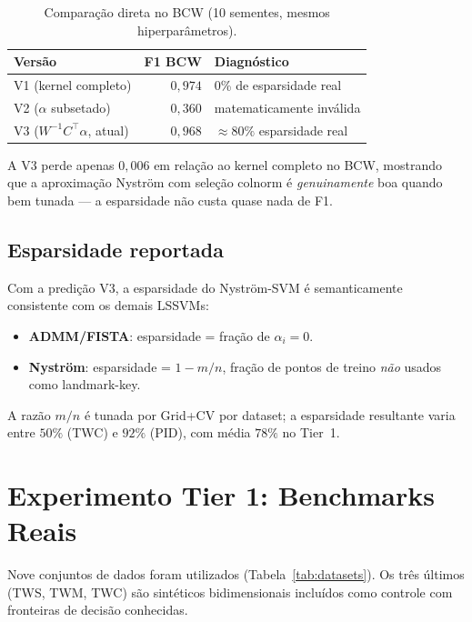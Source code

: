 \documentclass[12pt,a4paper]{article}
\begin{document}
\begin{table}[H]
\centering
\caption{Comparação direta no BCW (10 sementes, mesmos hiperparâmetros).}
\label{tab:nystrom_audit}
\begin{tabular}{lrl}
\toprule
\textbf{Versão} & \textbf{F1 BCW} & \textbf{Diagnóstico} \\
\midrule
V1 (kernel completo)        & $0{,}974$ & 0\% de esparsidade real \\
V2 ($\alpha$ subsetado)      & $0{,}360$ & matematicamente inválida \\
V3 ($W^{-1}C^\top\alpha$, atual) & $0{,}968$ & $\approx 80\%$ esparsidade real \\
\bottomrule
\end{tabular}
\end{table}

A V3 perde apenas $0{,}006$ em relação ao kernel completo no BCW, mostrando
que a aproximação Nyström com seleção colnorm é \emph{genuinamente} boa
quando bem tunada --- a esparsidade não custa quase nada de F1.

\subsection{Esparsidade reportada}

Com a predição V3, a esparsidade do Nyström-SVM é semanticamente consistente
com os demais LSSVMs:
\begin{itemize}
  \item \textbf{ADMM/FISTA}: esparsidade = fração de $\alpha_i = 0$.
  \item \textbf{Nyström}: esparsidade = $1 - m/n$, fração de pontos de treino
        \emph{não} usados como landmark-key.
\end{itemize}
A razão $m/n$ é tunada por Grid+CV por dataset; a esparsidade resultante varia
entre $50\%$ (TWC) e $92\%$ (PID), com média $78\%$ no Tier~1.

\section{Experimento Tier 1: Benchmarks Reais}
\label{sec:tier1}

Nove conjuntos de dados foram utilizados (Tabela~\ref{tab:datasets}).
Os três últimos (TWS, TWM, TWC) são sintéticos bidimensionais incluídos como
controle com fronteiras de decisão conhecidas.
\end{document}
